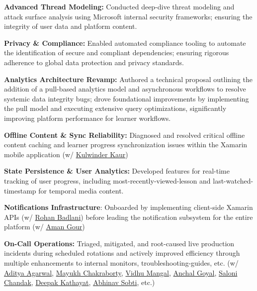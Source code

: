 \documentclass[a4paper,11pt]{article}
\begin{document}
\vspace{1mm}
\item \textbf{Advanced Thread Modeling:} Conducted deep-dive threat modeling and attack surface analysis using Microsoft internal security frameworks; ensuring the integrity of user data and platform content.
\vspace{1mm}
\item \textbf{Privacy \& Compliance:} Enabled automated compliance tooling to automate the identification of secure and compliant dependencies; ensuring rigorous adherence to global data protection and privacy standards.
\vspace{1mm}
\item \textbf{Analytics Architecture Revamp:} Authored a technical proposal outlining the addition of a pull-based analytics model and asynchronous workflows to resolve systemic data integrity bugs; drove foundational improvements by implementing the pull model and executing extensive query optimizations, significantly improving platform performance for learner workflows.
\vspace{1mm}
\item \textbf{Offline Content \& Sync Reliability:} Diagnosed and resolved critical offline content caching and learner progress synchronization issues within the Xamarin mobile application (w/ \href{https://www.linkedin.com/in/kulwinder-kaur-5064817a/}{Kulwinder Kaur})
\vspace{1mm}
\item \textbf{State Persistence \& User Analytics:} Developed features for real-time tracking of user progress, including most-recently-viewed-lesson and last-watched-timestamp for temporal media content.
\vspace{1mm}
\item \textbf{Notifications Infrastructure}: Onboarded by implementing client-side Xamarin APIs (w/ \href{https://scholar.google.com/citations?user=sk-qH8wAAAAJ&hl=en&oi=ao}{Rohan Badlani}) before leading the notification subsystem for the entire platform (w/ \href{https://www.linkedin.com/in/amangour/}{Aman Gour})
\vspace{1mm}
\item \textbf{On-Call Operations:} Triaged, mitigated, and root-caused live production incidents during scheduled rotations and actively improved efficiency through multiple enhancements to internal monitors, troubleshooting-guides, etc. (w/ \href{https://www.linkedin.com/in/skymanaditya1/}{Aditya Agarwal}, \href{https://www.linkedin.com/in/cmayukh/}{Mayukh Chakraborty}, \href{https://www.linkedin.com/in/vidhu-mangal/}{Vidhu Mangal}, \href{https://www.linkedin.com/in/anchal-goyal-5096619b/}{Anchal Goyal}, \href{https://www.linkedin.com/in/saloni-chandak-46553454/}{Saloni Chandak}, \href{https://www.linkedin.com/in/dmkxyz/}{Deepak Kathayat}, \href{https://www.linkedin.com/in/abhinavsobti/}{Abhinav Sobti}, etc.)
\end{document}
